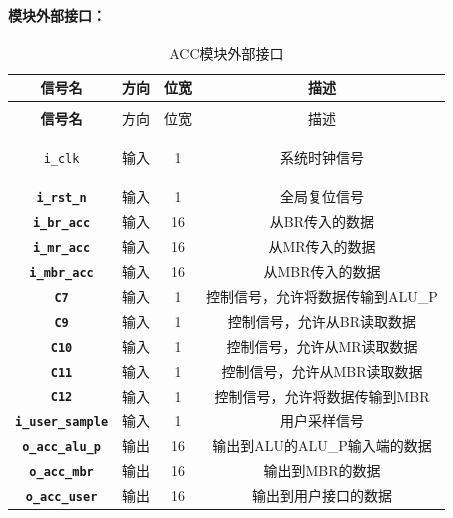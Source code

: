 \documentclass[lang=cn,a4paper,newtx]{elegantpaper}
\begin{document}
\paragraph{模块外部接口：}
\begin{longtable}{>{\bfseries}c c c c}
  \caption{ACC模块外部接口} \\ 
  \toprule
  信号名 & 方向 & 位宽 & 描述 \\ 
  \midrule
  \endfirsthead

  \multicolumn{4}{l}{\textbf{（续表）ACC模块外部接口}} \\ 
  \toprule
  信号名 & 方向 & 位宽 & 描述 \\ 
  \midrule
  \endhead

  \texttt{i\_clk} & 输入 & 1 & 系统时钟信号 \\ 
  \texttt{i\_rst\_n} & 输入 & 1 & 全局复位信号 \\ 
  \texttt{i\_br\_acc} & 输入 & 16 & 从BR传入的数据 \\ 
  \texttt{i\_mr\_acc} & 输入 & 16 & 从MR传入的数据 \\ 
  \texttt{i\_mbr\_acc} & 输入 & 16 & 从MBR传入的数据 \\ 
  \texttt{C7} & 输入 & 1 & 控制信号，允许将数据传输到ALU\_P \\ 
  \texttt{C9} & 输入 & 1 & 控制信号，允许从BR读取数据 \\ 
  \texttt{C10} & 输入 & 1 & 控制信号，允许从MR读取数据 \\ 
  \texttt{C11} & 输入 & 1 & 控制信号，允许从MBR读取数据 \\ 
  \texttt{C12} & 输入 & 1 & 控制信号，允许将数据传输到MBR \\ 
  \texttt{i\_user\_sample} & 输入 & 1 & 用户采样信号 \\ 
  \texttt{o\_acc\_alu\_p} & 输出 & 16 & 输出到ALU的ALU\_P输入端的数据 \\ 
  \texttt{o\_acc\_mbr} & 输出 & 16 & 输出到MBR的数据 \\ 
  \texttt{o\_acc\_user} & 输出 & 16 & 输出到用户接口的数据 \\ 
  \bottomrule
\end{longtable}
\end{document}
